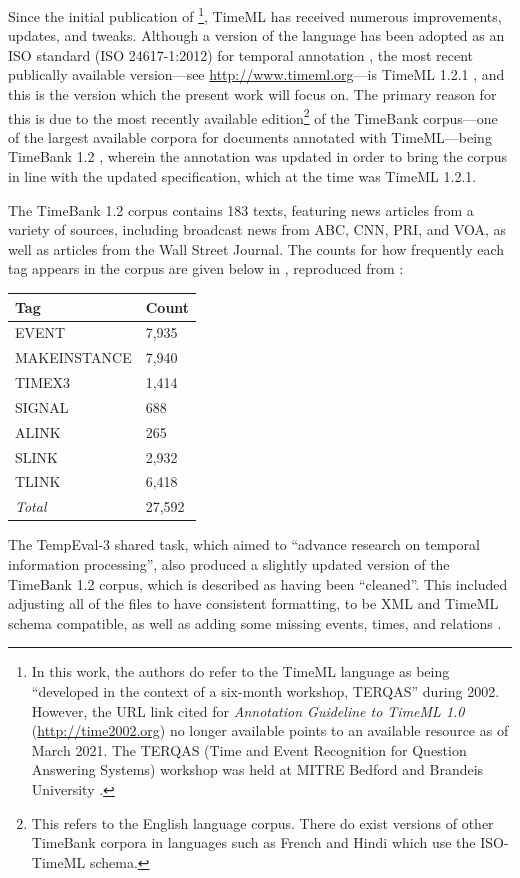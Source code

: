 \documentclass[a4paper,12pt,leqno]{article}
\begin{document}
Since the initial publication of \citet{pustejovsky2003timeml}\footnote{In this work, the authors do refer to the TimeML language as being ``developed in the context of a six-month workshop, TERQAS'' during 2002. However, the URL link cited for \textit{Annotation Guideline to TimeML 1.0} (\url{http://time2002.org}) no longer available points to an available resource as of March 2021. The TERQAS (Time and Event Recognition for Question Answering Systems) workshop was held at MITRE Bedford and Brandeis University \citep[p. 647]{pustejovsky2003timebank}.}, TimeML has received numerous improvements, updates, and tweaks. Although a version of the language has been adopted as an ISO standard (ISO 24617-1:2012) for temporal annotation \citep{pustejovsky2010iso}, the most recent publically available version---see \url{http://www.timeml.org}---is TimeML 1.2.1 \citep{timeml2005timeml,sauri2006timeml}, and this is the version which the present work will focus on. The primary reason for this is due to the most recently available edition\footnote{This refers to the English language corpus. There do exist versions of other TimeBank corpora in languages such as French \citep{bittar2011french} and Hindi \citep{goel2020hindi} which use the ISO-TimeML schema.} of the TimeBank corpus---one of the largest available corpora for documents annotated with TimeML---being TimeBank 1.2 \citep{pustejovsky2006timebank}, wherein the annotation was updated in order to bring the corpus in line with the updated specification, which at the time was TimeML 1.2.1.

The TimeBank 1.2 corpus contains 183 texts, featuring news articles from a variety of sources, including broadcast news from ABC, CNN, PRI, and VOA, as well as articles from the Wall Street Journal. The counts for how frequently each tag appears in the corpus are given below in , reproduced from \citet{pustejovsky2006timebank}:
\begin{center}
	\onehalfspacing
	\begin{tabular}[h!]{|l l|}
		\hline
		\textbf{Tag} & \textbf{Count}\\
		\hline
		EVENT & 7,935\\
		MAKEINSTANCE & 7,940\\
		TIMEX3 & 1,414\\
		SIGNAL & 688\\
		ALINK & 265\\
		SLINK & 2,932\\
		TLINK & 6,418\\
		\textit{Total} & 27,592\\
		\hline
	\end{tabular}
	\label{fig:timebank-stats}
\end{center}
The TempEval-3 \citep{uzzaman2013semeval} shared task, which aimed to ``advance research on temporal information processing'', also produced a slightly updated version of the TimeBank 1.2 corpus, which is described as having been ``cleaned''. This included adjusting all of the files to have consistent formatting, to be XML and TimeML schema compatible, as well as adding some missing events, times, and relations \citep[p. 2]{uzzaman2013semeval}.
\end{document}

